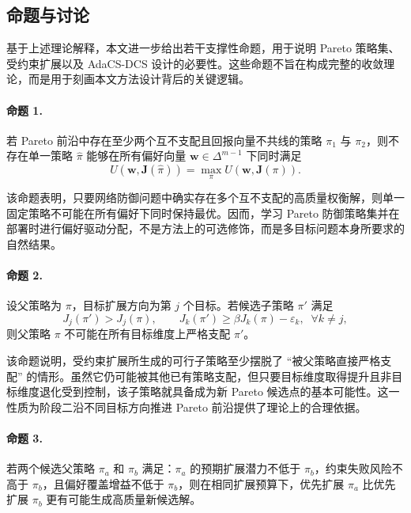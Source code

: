 \documentclass[12pt,a4paper]{article}
\begin{document}
\subsection{命题与讨论}

基于上述理论解释，本文进一步给出若干支撑性命题，用于说明 Pareto 策略集、受约束扩展以及 AdaCS-DCS 设计的必要性。这些命题不旨在构成完整的收敛理论，而是用于刻画本文方法设计背后的关键逻辑。

\paragraph{命题 1.}
若 Pareto 前沿中存在至少两个互不支配且回报向量不共线的策略 $\pi_1$ 与 $\pi_2$，则不存在单一策略 $\hat{\pi}$ 能够在所有偏好向量 $\mathbf{w}\in\Delta^{m-1}$ 下同时满足
\begin{equation}
U(\mathbf{w}, \mathbf{J}(\hat{\pi}))
=
\max_{\pi} U(\mathbf{w}, \mathbf{J}(\pi)).
\end{equation}

该命题表明，只要网络防御问题中确实存在多个互不支配的高质量权衡解，则单一固定策略不可能在所有偏好下同时保持最优。因而，学习 Pareto 防御策略集并在部署时进行偏好驱动分配，不是方法上的可选修饰，而是多目标问题本身所要求的自然结果。

\paragraph{命题 2.}
设父策略为 $\pi$，目标扩展方向为第 $j$ 个目标。若候选子策略 $\pi'$ 满足
\begin{equation}
J_j(\pi') > J_j(\pi),
\qquad
J_k(\pi') \ge \beta J_k(\pi) - \varepsilon_k,\;\; \forall k \neq j,
\end{equation}
则父策略 $\pi$ 不可能在所有目标维度上严格支配 $\pi'$。

该命题说明，受约束扩展所生成的可行子策略至少摆脱了 ``被父策略直接严格支配'' 的情形。虽然它仍可能被其他已有策略支配，但只要目标维度取得提升且非目标维度退化受到控制，该子策略就具备成为新 Pareto 候选点的基本可能性。这一性质为阶段二沿不同目标方向推进 Pareto 前沿提供了理论上的合理依据。

\paragraph{命题 3.}
若两个候选父策略 $\pi_a$ 和 $\pi_b$ 满足：$\pi_a$ 的预期扩展潜力不低于 $\pi_b$，约束失败风险不高于 $\pi_b$，且偏好覆盖增益不低于 $\pi_b$，则在相同扩展预算下，优先扩展 $\pi_a$ 比优先扩展 $\pi_b$ 更有可能生成高质量新候选解。
\end{document}
